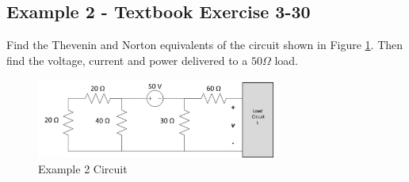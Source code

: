 \documentclass{handout}
\begin{document}

\newpage
\clearpage
\pagebreak


\subsection{Example 2 - Textbook Exercise 3-30}
Find the Thevenin and Norton equivalents of the circuit shown in Figure \ref{fig: Example2}.  Then find the voltage, current and power delivered to a $50 \Omega$ load. 
\begin{figure} [h t b]
\centering
\includegraphics[width=0.7\textwidth]{Example2.jpg}
\caption{Example 2 Circuit}
\label{fig: Example2}
\end{figure}
\end{document}
